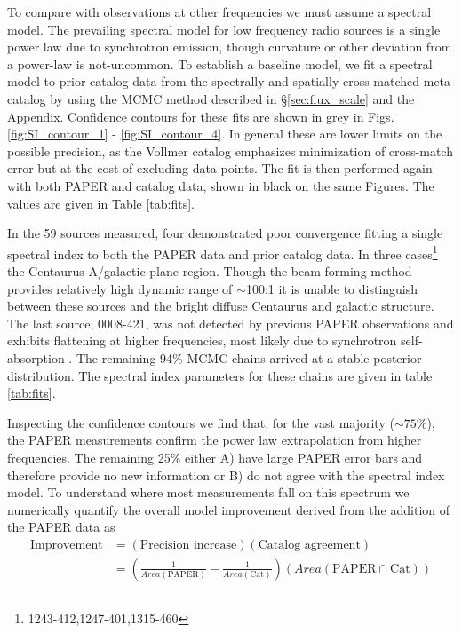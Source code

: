 \documentclass[preprint]{aastex}
\newcommand{\PAPER}{\mathrm{PAPER}}
\begin{document}
To compare with observations at other frequencies we must assume a spectral
model. The prevailing spectral model for low frequency radio sources is a
single power law due to synchrotron emission, though curvature or other
deviation from a power-law is not-uncommon.   To establish a baseline model, we
fit a spectral model to prior catalog data from the spectrally and spatially
cross-matched meta-catalog by \citet{Vollmer:2010p6422} using the MCMC method
described in \S \ref{sec:flux_scale} and the Appendix. Confidence contours for
these fits are shown in grey in Figs. \ref{fig:SI_contour_1} -
\ref{fig:SI_contour_4}.  In general these are lower limits on the possible
precision, as the Vollmer catalog emphasizes minimization of cross-match error
but at the cost of excluding data points.  The fit is then performed again with
both PAPER and catalog data, shown in black on the same Figures. The values are
given in Table \ref{tab:fits}. 


In the 59 sources measured, four demonstrated poor convergence fitting a single
spectral index to both the PAPER data and prior catalog data. In three
cases\footnote{1243-412,1247-401,1315-460} %
the Centaurus A/galactic plane region. Though the beam forming method provides
relatively high dynamic range of $\sim$100:1 it is unable to distinguish
between these sources and the bright diffuse Centaurus and galactic structure.
The last source, 0008-421, was not detected by previous PAPER observations and
exhibits flattening at higher frequencies, most likely due to synchrotron
self-absorption \citep{Jacobs:2011p8438} .  The remaining 94\% MCMC chains
arrived at a stable posterior distribution. The spectral index parameters for
these chains are given in table \ref{tab:fits}.

Inspecting the confidence contours we find that, for the vast majority ($\sim
75$\%), the PAPER measurements confirm the power law extrapolation from higher
frequencies. The remaining 25\% either A) have large PAPER error bars and
therefore provide no new information or B) do not agree with the spectral index
model.  To understand where most measurements fall on this spectrum we
numerically quantify the overall model improvement derived from the addition of
the PAPER data as 
\begin{align}
\textrm{Improvement} &= \left(\textrm{Precision increase}\right) \left(\textrm{Catalog agreement}\right)\\
&= \left(\frac{1}{Area(\textrm{PAPER})} - \frac{1}{Area(\textrm{Cat})}\right) \left( Area(\PAPER \cap \textrm{Cat}) \right)
\end{align}
\end{document}
